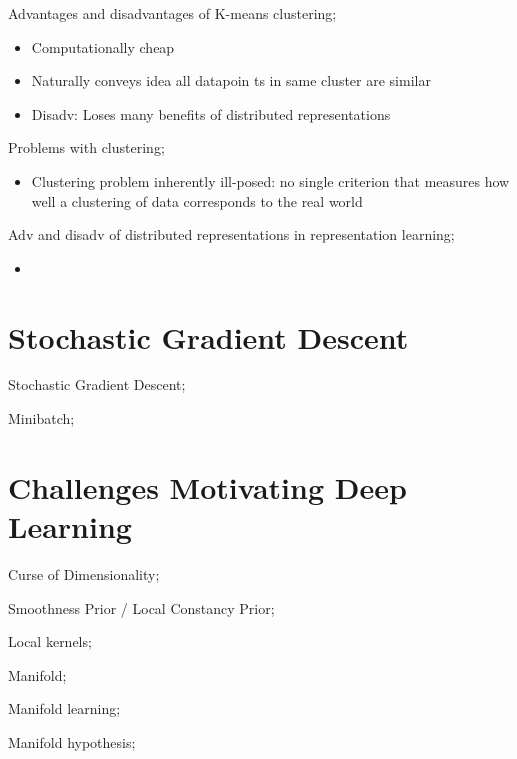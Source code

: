 \documentclass{article}
\begin{document}
Advantages and disadvantages of K-means clustering; \begin{itemize}
	\item Computationally cheap
	\item Naturally conveys idea all datapoin ts in same cluster are similar
	\item Disadv: Loses many benefits of distributed representations
\end{itemize}

Problems with clustering; \begin{itemize}
	\item Clustering problem inherently ill-posed: no single criterion that measures how well a clustering of data corresponds to the real world
\end{itemize}

Adv and disadv of distributed representations in representation learning; \begin{itemize}
	\item 
\end{itemize}

\section{Stochastic Gradient Descent}

Stochastic Gradient Descent;

Minibatch;

\section{Challenges Motivating Deep Learning}

Curse of Dimensionality;

Smoothness Prior / Local Constancy Prior;

Local kernels;

Manifold;

Manifold learning;

Manifold hypothesis;
\end{document}
